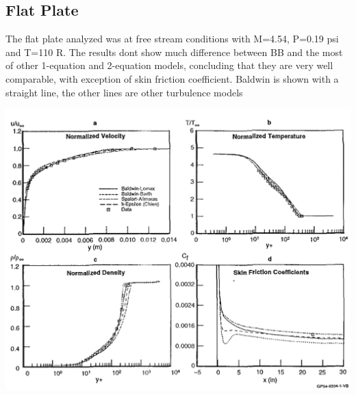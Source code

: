 \documentclass{article}
\begin{document}
\subsection{Flat Plate}
The flat plate analyzed was at free stream conditions with M=4.54, P=0.19 psi and T=110 R. The results dont show much difference between BB and the most of other 1-equation and 2-equation models, concluding that they are very well comparable, with exception of skin friction coefficient. Baldwin is shown with a straight line, the other lines are other turbulence models
\begin{center}
\includegraphics[scale=0.5]{Graph1.PNG}
\end{center}
\newpage
\end{document}
